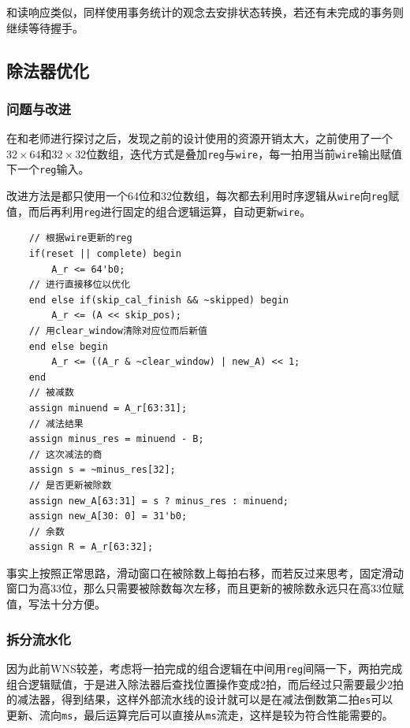 \documentclass[UTF-8,twoside,c5size]{ctexart}
\begin{document}
	和读响应类似，同样使用事务统计的观念去安排状态转换，若还有未完成的事务则继续等待握手。

	\subsection{除法器优化}
	
	\subsubsection{问题与改进}
	
	在和老师进行探讨之后，发现之前的设计使用的资源开销太大，之前使用了一个$32\times 64$和$32\times 32$位数组，迭代方式是叠加\texttt{reg}与\texttt{wire}，每一拍用当前\texttt{wire}输出赋值下一个\texttt{reg}输入。
	
	改进方法是都只使用一个64位和32位数组，每次都去利用时序逻辑从\texttt{wire}向\texttt{reg}赋值，而后再利用\texttt{reg}进行固定的组合逻辑运算，自动更新\texttt{wire}。
	
    \begin{verbatim}
    // 根据wire更新的reg
    if(reset || complete) begin
        A_r <= 64'b0;
    // 进行直接移位以优化
    end else if(skip_cal_finish && ~skipped) begin
        A_r <= (A << skip_pos);
    // 用clear_window清除对应位而后新值
    end else begin
        A_r <= ((A_r & ~clear_window) | new_A) << 1;
    end
    // 被减数
    assign minuend = A_r[63:31];
    // 减法结果
    assign minus_res = minuend - B;
    // 这次减法的商
    assign s = ~minus_res[32];
    // 是否更新被除数
    assign new_A[63:31] = s ? minus_res : minuend;
    assign new_A[30: 0] = 31'b0;
    // 余数
    assign R = A_r[63:32];
    \end{verbatim}
	
	事实上按照正常思路，滑动窗口在被除数上每拍右移，而若反过来思考，固定滑动窗口为高33位，那么只需要被除数每次左移，而且更新的被除数永远只在高33位赋值，写法十分方便。
	
	\subsubsection{拆分流水化}
	
	因为此前WNS较差，考虑将一拍完成的组合逻辑在中间用\texttt{reg}间隔一下，两拍完成组合逻辑赋值，于是进入除法器后查找位置操作变成2拍，而后经过只需要最少2拍的减法器，得到结果，这样外部流水线的设计就可以是在减法倒数第二拍\texttt{es}可以更新、流向\texttt{ms}，最后运算完后可以直接从\texttt{ms}流走，这样是较为符合性能需要的。
	
\end{document}
